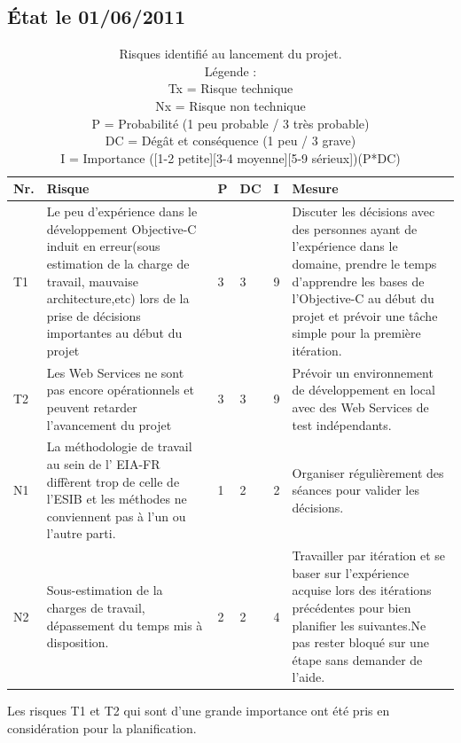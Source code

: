 	\subsection{État le 01/06/2011  }
	\begin{table}[H]
	\begin{tabular}{|l|p{6cm}|l|l|l|p{6cm}|}
		\hline  Nr. & Risque & P  & DC & I & Mesure \\ 
		\hline  T1 & Le peu d'expérience dans le développement \gls{Objective-C} induit en erreur(sous estimation de la charge de travail, mauvaise architecture,etc) lors de la prise de décisions importantes au début du projet & 3 & 3 & 9 & Discuter les décisions avec des personnes ayant de l'expérience dans le domaine, prendre le temps d'apprendre les bases de l'\gls{Objective-C} au début du projet et prévoir une tâche simple pour la première itération.  \\ 
		\hline  T2 & Les Web Services ne sont pas encore opérationnels et peuvent retarder l'avancement du projet & 3 & 3 & 9 & Prévoir un environnement de développement en local avec des Web Services de test indépendants.  \\ 
		\hline  N1 & La méthodologie de travail au sein de l' \gls{EIA-FR} diffèrent trop de celle de l'\gls{ESIB}  et les méthodes ne conviennent pas à l'un ou l'autre parti.  & 1 & 2 & 2 & Organiser régulièrement des séances pour valider les décisions.  \\ 
		\hline  N2 & Sous-estimation de la charges de travail, dépassement du temps mis à disposition.  & 2 & 2 & 4 & Travailler par itération et se baser sur l'expérience acquise lors des itérations précédentes pour bien planifier les suivantes.Ne pas rester bloqué sur une étape sans demander de l'aide.  \\ 
		
		\hline 
	\end{tabular} 
	\caption{ Risques identifié au lancement du projet.\\ Légende :\\
Tx = Risque technique\\
Nx = Risque non technique\\
P = Probabilité  (1 peu probable / 3 très probable)\\ 
DC = Dégât et conséquence (1 peu / 3 grave)\\
I =  Importance ([1-2 petite][3-4 moyenne][5-9 sérieux])(P*DC)
}
	\end{table}
Les risques T1 et T2 qui sont d'une grande importance ont été pris en considération pour la planification.
